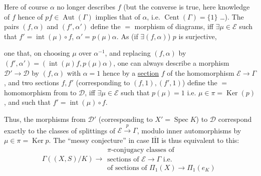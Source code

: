 Here of course $\alpha$ no longer describes $f$ (but the converse is  true, here knowledge of $f$ hence of $pf\in\operatorname{Aut}(\Gamma)$ implies that of $\alpha$, i.e. $\operatorname{Cent}(\Gamma)=\{1\}$ \ldots).
The pairs $(f,\alpha)$ and $(f',\alpha')$ define the $=$ morphism of diagrams, iff $\exists\mu\in\mathcal E$ such that $f'=\operatorname{int}(\mu)\circ f$, $\alpha'=p(\mu)\alpha$.
As (if $\exists(f,\alpha)$) $p$ is surjective,



one  that, on choosing $\mu$ over  $\alpha^{-1}$, and replacing $(f,\alpha)$ by $(f',\alpha')=(\operatorname{int}(\mu)f,p(\mu)\alpha)$, one can always describe a morphism $\mathcal D'\to\mathcal D$ by $(f,\alpha)$ with $\alpha=1$ hence by a \uline{section} $f$ of the homomorphism $\mathcal E\to\Gamma$, and two sections $f,f'$ (corresponding to $(f,1),(f',1)$) define the $=$ homomorphism from  to $\mathcal D$, iff $\exists\mu\in\mathcal E$ such that $p(\mu)=1$ i.e. $\mu\in\pi=\operatorname{Ker}(p)$, and such that $f'=\operatorname{int}(\mu)\circ f$.

Thus, the morphisms from $\mathcal D'$ (corresponding to $X'=\operatorname{Spec}K$) to $\mathcal D$ correspond exactly to the classes of splittings of $\mathcal E\xrightarrow{p}\Gamma$, modulo inner automorphisms by $\mu\in\pi=\operatorname{Ker}p$. The ``messy conjecture'' in case \uline{$\overline{\mathrm{III}}$} is thus equivalent to this:
\[
 \Gamma((X,S)/K)\longrightarrow
 \begin{gathered}
 \text{$\pi$-conjugacy classes of}\\
 \text{sections of }\mathcal E\to\Gamma\text{ i.e.}\\
 \text{of sections of }\Pi_1(X)\to\Pi_1(e_K)
 \end{gathered}
\]

